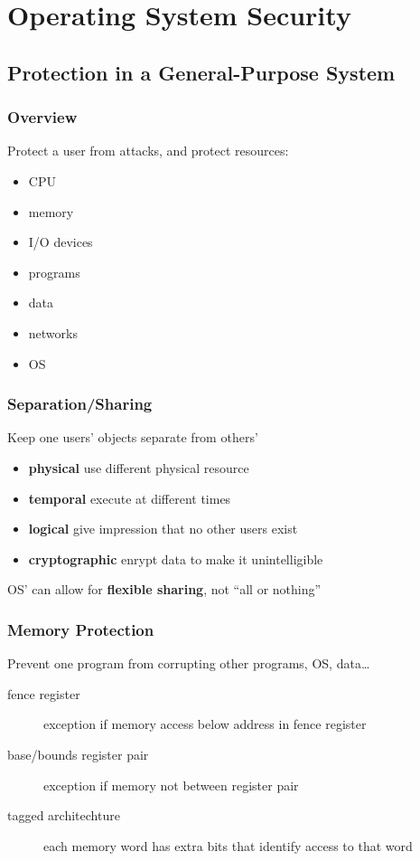 \documentclass[]{article}
\theoremstyle{definition}
\begin{document}
	\section{Operating System Security}
	\subsection{Protection in a General-Purpose System}
	\subsubsection{Overview}
	Protect a user from attacks, and protect resources:
	\begin{itemize}
		\item CPU
		\item memory
		\item I/O devices
		\item programs
		\item data
		\item networks
		\item OS
	\end{itemize}

	\subsubsection{Separation/Sharing}
	Keep one users' objects separate from others'
	\begin{itemize}
		\item \textbf{physical} use different physical resource
		\item \textbf{temporal} execute at different times
		\item \textbf{logical} give impression that no other users exist
		\item \textbf{cryptographic} enrypt data to make it unintelligible
	\end{itemize}
	OS' can allow for \textbf{flexible sharing}, not ``all or nothing''
	\subsubsection{Memory Protection}
	Prevent one program from corrupting other programs, OS, data\dots
	\begin{description}
		\item[fence register] exception if memory access below address in fence register
		\item[base/bounds register pair] exception if memory not between register pair
		\item[tagged architechture] each memory word has extra bits that identify access to that word
	\end{description}
	
\end{document}
